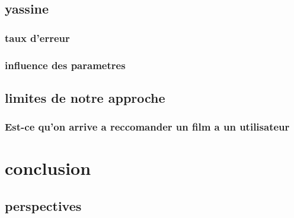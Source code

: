 \documentclass[a4paper,10pt]{article}
\begin{document}
\subsection{yassine}
\subsubsection{taux d'erreur}
\subsubsection{influence des parametres}
\subsection{limites de notre approche}
\subsubsection{Est-ce qu'on arrive a reccomander un film a un utilisateur}
\section{conclusion}

\subsection{perspectives}
\end{document}
